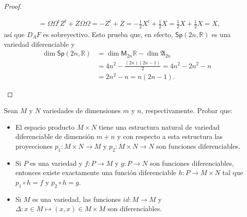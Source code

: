 \documentclass[11pt]{article}
\newcommand{\R}{\mathbb{R}}
\newcommand{\M}[2]{\mathsf{M}_{#1}#2}
\newcommand{\paint}[2]{\color{#1}{#2}}
\newenvironment{exercise}[2][Ejercicio]{\begin{trivlist}
\item[\hskip \labelsep \paint{purple}{{\bfseries #1}}\hskip \labelsep {\bfseries #2.}]}{\end{trivlist}}
\begin{document}
\begin{proof}
\begin{itemize}
\begin{align*}
& = \Omega\Omega^t Z^t + Z\Omega\Omega = -Z^t + Z = -\frac{1}{2}X^t + \frac{1}{2}X = \frac{1}{2}X + \frac{1}{2}X = X,
\end{align*}
as\'i que $D_A F$ es sobreyectivo. Esto prueba que, en efecto, $\mathsf{Sp}(2n,\R)$ es una variedad diferenciable y
\begin{align*}
\dim \mathsf{Sp}(2n,\R) &= \dim \M{2n}{\R}- \dim \mathfrak{A}_{2n}\\
& = 4n^2 - \frac{(2n)(2n-1)}{2} = 4n^2-2n^2-n\\
& = 2n^2 - n = n(2n-1).
\end{align*}
\end{itemize}
\end{proof}

\begin{exercise}{7} Sean $M$ y $N$ variedades de dimensiones $m$ y $n$, respectivamente. Probar que:
\begin{itemize}
\item[(a)] El espacio producto $M \times N$ tiene una estructura natural de
variedad diferenciable de dimensi\'on $m+n$ y con respecto a esta estructura
las proyecciones $p_1:M\times N\to M$ y $p_2:M\times N\to N$ son funciones diferenciables.
\item[(b)] Si $P$ es una variedad y $f:P\to M$ y $g:P\to N$ son funciones
diferenciables, entonces existe exactamente una funci\'on diferenciable $h:P\to M\times N$ tal que $p_1\circ h=f$ y $p_2\circ h=g$.
\item[(c)] Si $M$ es una variedad, las funciones $id : M \to M$ y $\Delta : x \in M \mapsto (x, x) \in M \times M$ son diferenciables.
\end{itemize}
\end{exercise}
\end{document}
